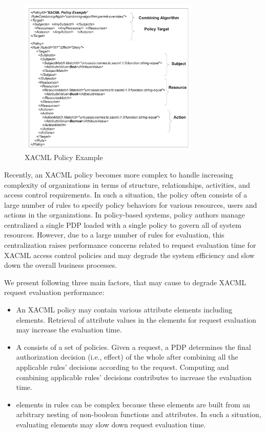 \begin{figure}[!h]
\begin{center}
\includegraphics[width=8.6cm]{xacml}
\caption{XACML Policy Example}
\label{figur1}
\end{center}
\end{figure}


Recently, an XACML policy becomes more complex to handle increasing complexity of organizations in terms of structure, relationships, activities, and access control requirements. In such a situation, the policy often consists of a large number of rules to specify policy behaviors for various resources, users and actions in the organizations.
In policy-based systems, policy authors manage centralized a single PDP loaded with a single policy to govern all of system resources. 
However, due to a large number of rules for evaluation, this centralization raises performance concerns related to request evaluation time for XACML access control policies and may 
degrade the system efficiency and slow down the overall business processes. 

We present following three main factors, that may cause to degrade XACML request evaluation performance: 

\begin{itemize}
\item An XACML policy may contain various attribute elements including  elements. Retrieval of
attribute values in the  elements for request evaluation may increase the evaluation time.
\item A  consists of a set of policies. Given a request, a PDP determines the final authorization decision (i.e., effect) of the whole  after combining all the applicable rules' decisions according to the request.
Computing and combining applicable rules' decisions contributes to increase the evaluation time.
\item {} elements in rules can be complex because these elements are built from an arbitrary nesting of non-boolean functions and attributes. 
In such a situation, evaluating  elements may slow down request evaluation time.
\end{itemize}

